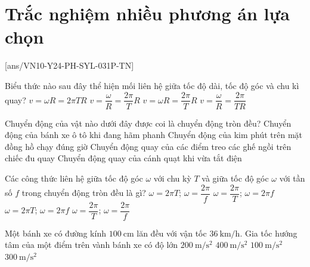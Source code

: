 \let\lesson\undefined
\newcommand{\lesson}{\phantomlesson{Bài 20.}}
\setcounter{section}{2}
\section{Trắc nghiệm nhiều phương án lựa chọn}
\setcounter{ex}{0}
[ans/VN10-Y24-PH-SYL-031P-TN]
\begin{ex}
	Biểu thức nào sau đây thể hiện mối liên hệ giữa tốc độ dài, tốc độ góc và chu kì quay?
	\choice
	{$v=\omega R=2\pi TR$}
	{$v=\dfrac{\omega}{R}=\dfrac{2\pi}{T}R$}
	{\True $v=\omega R=\dfrac{2\pi}{T}R$}
	{$v=\dfrac{\omega}{R}=\dfrac{2\pi}{TR}$}
	\loigiai{}
\end{ex}
\begin{ex}
Chuyển động của vật nào dưới đây được coi là chuyển động tròn đều?	
	\choice
	{Chuyển động của bánh xe ô tô khi đang hãm phanh}
	{\True Chuyển động của kim phút trên mặt đồng hồ chạy đúng giờ}
	{Chuyển động quay của các điểm treo các ghế ngồi trên chiếc đu quay}
	{Chuyển động quay của cánh quạt khi vừa tắt điện}
\end{ex}
\begin{ex}
	Các công thức liên hệ giữa tốc độ góc $\omega$ với chu kỳ $T$ và giữa tốc độ góc $\omega$ với tần số $f$ trong chuyển động tròn đều là gì?
	\choice
	{$\omega=2\pi T$; $\omega=\dfrac{2\pi}{f}$}
	{\True $\omega=\dfrac{2\pi}{T}$; $\omega=2\pi f$}
	{$\omega=2\pi T$; $\omega=2\pi f$}
	{$\omega=\dfrac{2\pi}{T}$; $\omega=\dfrac{2\pi}{f}$}
\end{ex}
\begin{ex}
Một bánh xe có đường kính $\SI{100}{\centi\meter}$ lăn đều với vận tốc $\SI{36}{\kilo\meter/\hour}$. Gia tốc hướng tâm của một điểm trên vành bánh xe có độ lớn	
	\choice
	{$\SI{200}{\meter/\second^2}$}
	{$\SI{400}{\meter/\second^2}$}
	{\True $\SI{100}{\meter/\second^2}$}
	{$\SI{300}{\meter/\second^2}$}
\end{ex}
